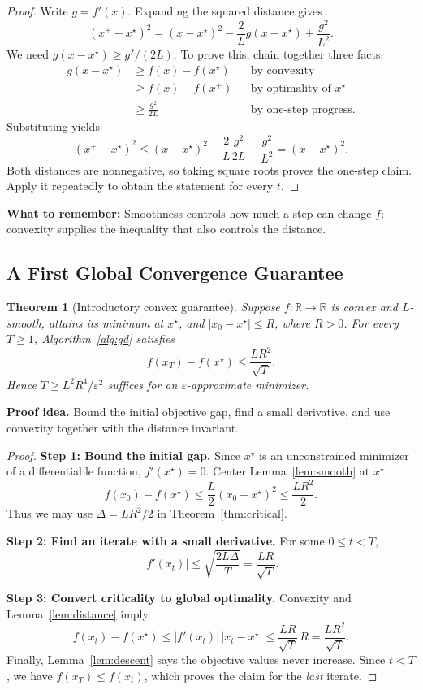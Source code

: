 \documentclass[11pt,letterpaper]{article}
\theoremstyle{definition}
\theoremstyle{plain}
\newtheorem{theorem}{Theorem}
\newcommand{\R}{\mathbb R}
\newcommand{\eps}{\varepsilon}
\newcommand{\xstar}{x^\star}
\begin{document}
\begin{proof}
Write $g=f'(x)$. Expanding the squared distance gives
\[
 (x^+-\xstar)^2
  =(x-\xstar)^2-\frac{2}{L}g(x-\xstar)+\frac{g^2}{L^2}.
\]
We need $g(x-\xstar)\geq g^2/(2L)$. To prove this, chain together
three facts:
\begin{align*}
  g(x-\xstar)
  &\geq f(x)-f(\xstar) &&\text{by convexity}\\
  &\geq f(x)-f(x^+) &&\text{by optimality of }\xstar\\
  &\geq \frac{g^2}{2L} &&\text{by one-step progress}.
\end{align*}
Substituting yields
\[
 (x^+-\xstar)^2
 \leq(x-\xstar)^2
   -\frac{2}{L}\frac{g^2}{2L}+\frac{g^2}{L^2}
 =(x-\xstar)^2.
\]
Both distances are nonnegative, so taking square roots proves the
one-step claim. Apply it repeatedly to obtain the statement for every $t$.
\end{proof}

\textbf{What to remember:} Smoothness controls how much a step can change
$f$; convexity supplies the inequality that also controls the distance.

\newpage
\subsection{A First Global Convergence Guarantee}

\begin{theorem}[Introductory convex guarantee]\label{thm:global}
Suppose $f:\R\to\R$ is convex and $L$-smooth, attains its minimum at
$\xstar$, and $|x_0-\xstar|\leq R$, where $R>0$. For every $T\geq1$,
Algorithm~\ref{alg:gd} satisfies
\[
  \boxed{f(x_T)-f(\xstar)\leq\frac{LR^2}{\sqrt T}.}
\]
Hence $T\geq L^2R^4/\eps^2$ suffices for an $\eps$-approximate minimizer.
\end{theorem}

\textbf{Proof idea.} Bound the initial objective gap, find a small
derivative, and use convexity together with the distance invariant.

\begin{proof}
\textbf{Step 1: Bound the initial gap.}
Since $\xstar$ is an unconstrained minimizer of a differentiable function,
$f'(\xstar)=0$. Center Lemma~\ref{lem:smooth} at $\xstar$:
\[
  f(x_0)-f(\xstar)
  \leq \frac L2(x_0-\xstar)^2
  \leq\frac{LR^2}{2}.
\]
Thus we may use $\Delta=LR^2/2$ in Theorem~\ref{thm:critical}.

\textbf{Step 2: Find an iterate with a small derivative.}
For some $0\leq t<T$,
\[
  |f'(x_t)|\leq\sqrt{\frac{2L\Delta}{T}}
          =\frac{LR}{\sqrt T}.
\]

\textbf{Step 3: Convert criticality to global optimality.}
Convexity and Lemma~\ref{lem:distance} imply
\[
  f(x_t)-f(\xstar)
  \leq |f'(x_t)|\,|x_t-\xstar|
  \leq \frac{LR}{\sqrt T}\,R=\frac{LR^2}{\sqrt T}.
\]
Finally, Lemma~\ref{lem:descent} says the objective values never increase.
Since $t<T$, we have $f(x_T)\leq f(x_t)$, which proves the claim for the
\emph{last} iterate.
\end{proof}
\end{document}
